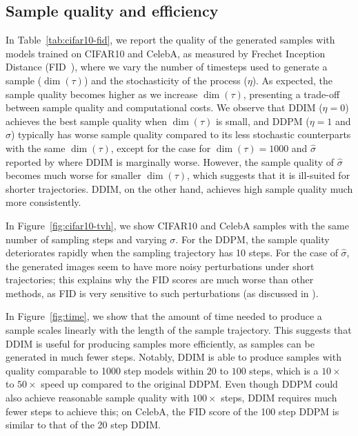 \subsection{Sample quality and efficiency} In Table~\ref{tab:cifar10-fid}, we report the quality of the generated samples with models trained on CIFAR10 and CelebA, as measured by Frechet  Inception Distance (FID~\citep{heusel2017gans}), where we vary the number of timesteps used to generate a sample ($\dim(\tau)$) and the stochasticity of the process ($\eta$).
As expected, the sample quality becomes higher as we increase $\dim(\tau)$, presenting a trade-off between sample quality and computational costs. We observe that DDIM ($\eta = 0$) achieves the best sample quality when $\dim(\tau)$ is small, and DDPM ($\eta = 1$ and $\hat{\sigma}$) typically has worse sample quality compared to its less stochastic counterparts with the same $\dim(\tau)$, except for the case for $\dim(\tau) = 1000$ and $\hat{\sigma}$ reported by \citet{ho2020denoising} where DDIM is marginally worse. However, the sample quality of $\hat{\sigma}$ becomes much worse for smaller $\dim(\tau)$, which suggests that it is ill-suited for shorter trajectories. DDIM, on the other hand, achieves high sample quality much more consistently. 

In Figure~\ref{fig:cifar10-tvh}, we show CIFAR10 and CelebA samples with the same number of sampling steps and varying $\sigma$. For the DDPM, the sample quality deteriorates rapidly when the sampling trajectory has 10 steps. For the case of $\hat{\sigma}$, the generated images seem to have more noisy perturbations under short trajectories; this explains why the FID scores are much worse than other methods, as FID is very sensitive to such perturbations (as discussed in \citet{Jolicoeur-Martineau2020adversarial}). 

In Figure~\ref{fig:time}, we show that the amount of time needed to produce a sample scales linearly with the length of the sample trajectory. This suggests that DDIM is useful for producing samples more efficiently, as samples can be generated in much fewer steps. Notably, DDIM is able to produce samples with quality comparable to 1000 step models within $20$ to $100$ steps, which is a $10\times$ to $50\times$ speed up compared to the original DDPM. Even though DDPM could also achieve reasonable sample quality with $100\times$ steps, DDIM requires much fewer steps to achieve this; on CelebA, the FID score of the 100 step DDPM is similar to that of the 20 step DDIM. 


